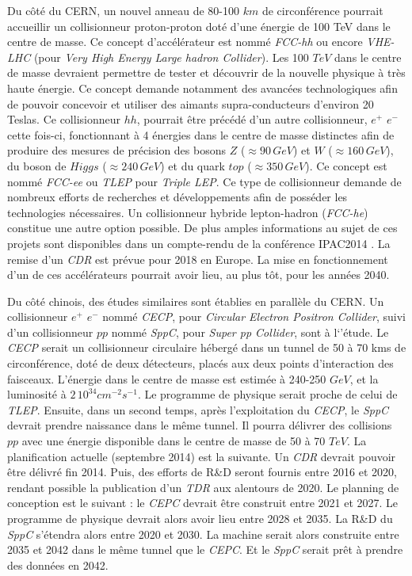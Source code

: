   Du côt\'e du CERN, un nouvel anneau de 80-100 $km$ de circonf\'erence pourrait accueillir un collisionneur proton-proton dot\'e d'une \'energie de 100 TeV dans le centre de masse. Ce concept d'acc\'el\'erateur est nomm\'e \textit{FCC-hh} ou encore \textit{VHE-LHC} (pour \textit{Very High Energy Large hadron Collider}). Les 100 $TeV$ dans le centre de masse devraient permettre de tester et d\'ecouvrir de la nouvelle physique \`a tr\`es haute \'energie. Ce concept demande notamment des avanc\'ees technologiques afin de pouvoir concevoir et utiliser des aimants supra-conducteurs d'environ 20 Teslas. Ce collisionneur $hh$, pourrait \^etre pr\'ec\'ed\'e d'un autre collisionneur, $e^+$ $e^-$ cette fois-ci, fonctionnant \`a 4 \'energies dans le centre de masse distinctes afin de produire des mesures de pr\'ecision des bosons $Z$ ($\approx 90 \, GeV$) et $W$ ($\approx 160 \, GeV$), du boson de $Higgs$ ($\approx 240 \, GeV$) et du quark $top$ ($\approx 350 \, GeV$). Ce concept est nomm\'e \textit{FCC-ee} ou \textit{TLEP} pour \textit{Triple LEP}. Ce type de collisionneur demande de nombreux efforts de recherches et d\'eveloppements afin de poss\'eder les technologies n\'ecessaires. Un collisionneur hybride lepton-hadron (\textit{FCC-he}) constitue une autre option possible. De plus amples informations au sujet de ces projets sont disponibles dans un compte-rendu de la conf\'erence IPAC2014 \cite{Benedikt:1742294}. La remise d'un \textit{CDR} est pr\'evue pour 2018 en Europe. La mise en fonctionnement d'un de ces acc\'el\'erateurs pourrait avoir lieu, au plus tôt, pour les ann\'ees 2040.
  
  \medskip
  
  Du côt\'e chinois, des \'etudes similaires sont établies en parall\`ele du CERN. Un collisionneur $e^+$ $e^-$ nomm\'e \textit{CECP}, pour \textit{Circular Electron Positron Collider}, suivi d'un collisionneur $pp$ nomm\'e \textit{SppC}, pour \textit{Super pp Collider}, sont à l`'\'etude. Le \textit{CECP} serait un collisionneur circulaire h\'eberg\'e dans un tunnel de 50 \`a 70 kms de circonf\'erence, dot\'e de deux d\'etecteurs, plac\'es aux deux points d'interaction des faisceaux. L'\'energie dans le centre de masse est estim\'ee \`a 240-250 $GeV$, et la luminosit\'e \`a $2 \, 10^{34} cm^{-2}s^{-1}$. Le programme de physique serait proche de celui de \textit{TLEP}. Ensuite, dans un second temps, apr\`es l'exploitation du \textit{CECP}, le \textit{SppC} devrait prendre naissance dans le m\^eme tunnel. Il pourra d\'elivrer des collisions $pp$ avec une \'energie disponible dans le centre de masse de 50 \`a 70 $TeV$. La planification actuelle (septembre 2014) est la suivante. Un \textit{CDR} devrait pouvoir \^etre d\'elivr\'e fin 2014. Puis, des efforts de R\&D seront fournis entre 2016 et 2020, rendant possible la publication d'un \textit{TDR} aux alentours de 2020. Le planning de conception est le suivant : le \textit{CEPC} devrait \^etre construit entre 2021 et 2027. Le programme de physique devrait alors avoir lieu entre 2028 et 2035. La R\&D du \textit{SppC} s'\'etendra alors entre 2020 et 2030. La machine serait alors construite entre 2035 et 2042 dans le m\^eme tunnel que le \textit{CEPC}. Et le \textit{SppC} serait pr\^et \`a prendre des donn\'ees en 2042.
  
